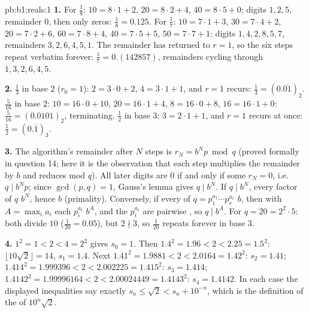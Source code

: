 \begin{solution}{pb:b1:reals:1}
\textbf{1.} For $\frac 18$: $10 = 8 \cdot 1 + 2$, $20 = 8 \cdot 2
+ 4$, $40 = 8 \cdot 5 + 0$; digits $1, 2, 5$, remainder $0$, then
only zeros: $\frac 18 = 0.125$. For $\frac 17$: $10 = 7 \cdot 1 +
3$, $30 = 7 \cdot 4 + 2$, $20 = 7 \cdot 2 + 6$, $60 = 7 \cdot 8 +
4$, $40 = 7 \cdot 5 + 5$, $50 = 7 \cdot 7 + 1$: digits $1, 4, 2,
8, 5, 7$, remainders $3, 2, 6, 4, 5, 1$. The remainder has
returned to $r = 1$, so the six steps repeat verbatim forever:
$\frac 17 = 0.(142857)$, remainders cycling through $1, 3, 2, 6,
4, 5$.

\textbf{2.} $\frac 13$ in base $2$ ($r_0 = 1$): $2 = 3 \cdot 0 +
2$, $4 = 3 \cdot 1 + 1$, and $r = 1$ recurs: $\frac 13 =
(0.\overline{01})_2$. $\frac{5}{16}$ in base $2$: $10 = 16 \cdot
0 + 10$, $20 = 16 \cdot 1 + 4$, $8 = 16 \cdot 0 + 8$, $16 = 16
\cdot 1 + 0$: $\frac{5}{16} = (0.0101)_2$, terminating. $\frac 12$
in base $3$: $3 = 2 \cdot 1 + 1$, and $r = 1$ recurs at once:
$\frac 12 = (0.\overline{1})_3$.

\textbf{3.} The algorithm's remainder after $N$ steps is $r_N =
b^N p \bmod q$ (proved formally in question 14; here it is the
observation that each step multiplies the remainder by $b$ and
reduces mod $q$). All later digits are $0$ if and only if some
$r_N = 0$, i.e.\ $q \mid b^N p$; since $\gcd(p, q) = 1$, Gauss's
lemma gives $q \mid b^N$. If $q \mid b^N$, every  factor of
$q$  $b^N$, hence  $b$ (primality). Conversely, if
every  of $q = p_1^{a_1} \cdots p_r^{a_r}$  $b$, then
with $A = \max_i a_i$ each $p_i^{a_i}$  $b^A$, and the
$p_i^{a_i}$ are pairwise , so $q \mid b^A$. For $q = 20 =
2^2 \cdot 5$: both  divide $10$ ($\frac{1}{20} = 0.05$),
but $2 \nmid 3$, so $\frac{1}{20}$ repeats forever in base $3$.

\textbf{4.} $1^2 = 1 < 2 < 4 = 2^2$ gives $s_0 = 1$. Then $1.4^2
= 1.96 < 2 < 2.25 = 1.5^2$: $\lfloor 10\sqrt 2 \rfloor = 14$,
$s_1 = 1.4$. Next $1.41^2 = 1.9881 < 2 < 2.0164 = 1.42^2$: $s_2 =
1.41$; $1.414^2 = 1.999396 < 2 < 2.002225 = 1.415^2$: $s_3 =
1.414$; $1.4142^2 = 1.99996164 < 2 < 2.00024449 = 1.4143^2$: $s_4
= 1.4142$. In each case the displayed inequalities say exactly
$s_n \leq \sqrt 2 < s_n + 10^{-n}$, which is the definition of
the  of $10^n \sqrt 2$.


\end{solution}

